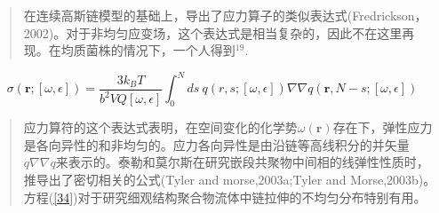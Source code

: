 \begin{quotation}
在连续高斯链模型的基础上，导出了应力算子的类似表达式(Fredrickson，2002)。对于非均匀应变场，这个表达式是相当复杂的，因此不在这里再现。在均质菌株的情况下，一个人得到$^{19}$.
\end{quotation}
\begin{equation}\label{34}
\sigma(\mathbf{r};[\omega,\epsilon])=\frac{3k_BT}{b^2VQ[\omega,\epsilon]}\int_{0}^{N} ds~q(r,s;[\omega,\epsilon])\nabla \nabla q(\mathbf{r},N-s;[\omega,\epsilon])
\end{equation}
\begin{quotation}
应力算符的这个表达式表明，在空间变化的化学势$\omega(\mathbf{r})$存在下，弹性应力是各向异性的和非均匀的。应力各向异性是由沿链等高线积分的并矢量$q\nabla \nabla q$来表示的。泰勒和莫尔斯在研究嵌段共聚物中间相的线弹性性质时，推导出了密切相关的公式(Tyler and morse,2003a;Tyler and Morse,2003b)。方程(\ref{34})对于研究细观结构聚合物流体中链拉伸的不均匀分布特别有用。
\end{quotation}
